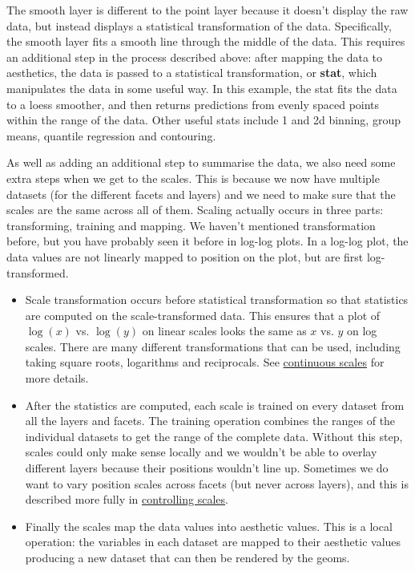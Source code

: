 The smooth layer is different to the point layer because it doesn't
display the raw data, but instead displays a statistical transformation
of the data. Specifically, the smooth layer fits a smooth line through
the middle of the data. This requires an additional step in the process
described above: after mapping the data to aesthetics, the data is
passed to a statistical transformation, or \textbf{stat}, which
manipulates the data in some useful way. In this example, the stat fits
the data to a loess smoother, and then returns predictions from evenly
spaced points within the range of the data. Other useful stats include 1
and 2d binning, group means, quantile regression and contouring.

As well as adding an additional step to summarise the data, we also need
some extra steps when we get to the scales. This is because we now have
multiple datasets (for the different facets and layers) and we need to
make sure that the scales are the same across all of them. Scaling
actually occurs in three parts: transforming, training and mapping. We
haven't mentioned transformation before, but you have probably seen it
before in log-log plots. In a log-log plot, the data values are not
linearly mapped to position on the plot, but are first log-transformed.

\begin{itemize}
\item
  Scale transformation occurs before statistical transformation so that
  statistics are computed on the scale-transformed data. This ensures
  that a plot of $\log(x)$ vs. $\log(y)$ on linear scales looks the same
  as $x$ vs. $y$ on log scales. There are many different transformations
  that can be used, including taking square roots, logarithms and
  reciprocals. See \hyperref[ssub:scale-continuous]{continuous scales}
  for more details.
\item
  After the statistics are computed, each scale is trained on every
  dataset from all the layers and facets. The training operation
  combines the ranges of the individual datasets to get the range of the
  complete data. Without this step, scales could only make sense locally
  and we wouldn't be able to overlay different layers because their
  positions wouldn't line up. Sometimes we do want to vary position
  scales across facets (but never across layers), and this is described
  more fully in \hyperref[sub:controlling-scales]{controlling scales}.
\item
  Finally the scales map the data values into aesthetic values. This is
  a local operation: the variables in each dataset are mapped to their
  aesthetic values producing a new dataset that can then be rendered by
  the geoms.
\end{itemize}

